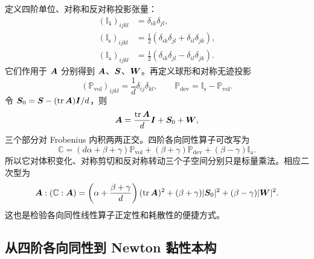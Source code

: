 定义四阶单位、对称和反对称投影张量：
\begin{align}
 (\mathbb I_4)_{ijkl}&=\delta_{ik}\delta_{jl},\\
 (\mathbb I_{\mathrm s})_{ijkl}
 &=\tfrac12(\delta_{ik}\delta_{jl}+\delta_{il}\delta_{jk}),\\
 (\mathbb I_{\mathrm a})_{ijkl}
 &=\tfrac12(\delta_{ik}\delta_{jl}-\delta_{il}\delta_{jk}).
\end{align}
它们作用于 $\bm{A}$ 分别得到 $\bm{A}$、$\bm{S}$、$\bm{W}$。再定义球形和对称无迹投影
\begin{equation}
 (\mathbb P_{\mathrm{vol}})_{ijkl}=\frac1d\delta_{ij}\delta_{kl},
 \qquad \mathbb P_{\mathrm{dev}}=\mathbb I_{\mathrm s}-\mathbb P_{\mathrm{vol}}.
\end{equation}
令 $\bm{S}_0=\bm{S}-(\operatorname{tr}\bm{A})\bm{I}/d$，则
\begin{equation}
 \bm{A}=\frac{\operatorname{tr}\bm{A}}{d}\bm{I}+\bm{S}_0+\bm{W},
\end{equation}
三个部分对 Frobenius 内积两两正交。四阶各向同性算子可改写为
\begin{equation}
 \mathbb C=(d\alpha+\beta+\gamma)\mathbb P_{\mathrm{vol}}
 +(\beta+\gamma)\mathbb P_{\mathrm{dev}}
 +(\beta-\gamma)\mathbb I_{\mathrm a}.
\end{equation}
所以它对体积变化、对称剪切和反对称转动三个子空间分别只是标量乘法。相应二次型为
\begin{equation}
 \bm{A}:(\mathbb C:\bm{A})
 =\left(\alpha+\frac{\beta+\gamma}{d}\right)(\operatorname{tr}\bm{A})^2
 +(\beta+\gamma)|\bm{S}_0|^2+(\beta-\gamma)|\bm{W}|^2.
\end{equation}
这也是检验各向同性线性算子正定性和耗散性的便捷方式。

\subsection{从四阶各向同性到 Newton 黏性本构}\label{subsec:tensor-newton}

